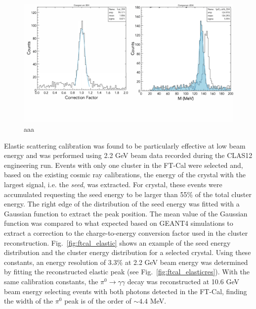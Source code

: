 \begin{figure}
\includegraphics[height=1.0\columnwidth]{fig/ftcal_pi0.pdf}
\caption{aaa}
\label{fig:ftcal_elasticcal}
\end{figure}
Elastic scattering calibration was found to be particularly effective at low beam energy and was performed using 2.2 GeV beam data recorded during the CLAS12 engineering run. Events with only one cluster in the FT-Cal were selected and, based on the existing cosmic ray calibrations, the energy of the crystal with the largest signal, i.e. the {\it seed}, was extracted. For crystal, these events were accumulated requesting the seed energy to be larger than 55\% of the total cluster energy. The right edge of the distribution of the seed energy was fitted with a Gaussian function to extract the peak position. The mean value of the Gaussian function was compared to what expected based on GEANT4 simulations to extract a correction to the charge-to-energy conversion factor used in the cluster reconstruction. Fig.~\ref{fig:ftcal_elastic} shows an example of the seed energy distribution and the cluster energy distribution for a selected crystal. Using these constants, an energy resolution of  3.3\% at 2.2 GeV beam energy was determined by fitting the reconstructed elastic peak (see Fig.~\ref{fig:ftcal_elasticres}). With the same calibration constants, the $\pi^0\to\gamma\gamma$ decay was reconstructed at 10.6 GeV beam energy selecting events with both photons detected in the FT-Cal, finding the width of the $\pi^0$ peak is of the order of $\sim 4.4$ MeV.
